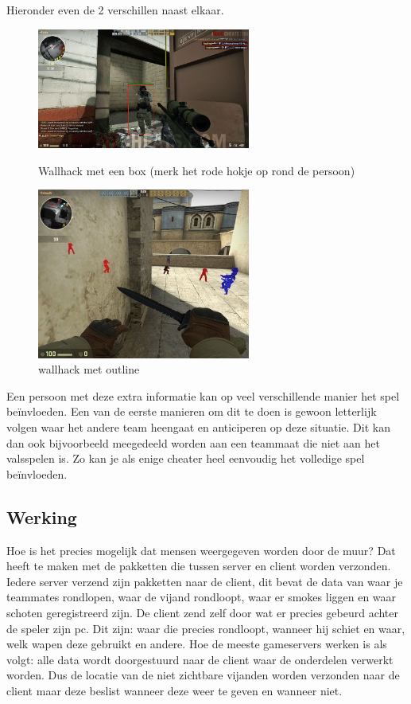 \documentclass[pdftex,a4paper,12pt,twoside]{report}
\begin{document}
Hieronder even de 2 verschillen naast elkaar.

\begin{figure}[H]
\centering
\begin{minipage}{0.48\textwidth}
\centering
\includegraphics[width=7cm]{img/wallhack-example-box}
\caption{Wallhack met een box (merk het rode hokje op rond de persoon)}
\end{minipage}\hfill
\begin{minipage}{0.48\textwidth}
\centering
\includegraphics[width=7cm]{img/wallhack-example-outline}
\caption{wallhack met outline}
\end{minipage}
\end{figure}  

Een persoon met deze extra informatie kan op veel verschillende manier het spel beïnvloeden. Een van de eerste manieren om dit te doen is gewoon letterlijk volgen waar het andere team heengaat en anticiperen op deze situatie. Dit kan dan ook bijvoorbeeld meegedeeld worden aan een teammaat die niet aan het valsspelen is. Zo kan je als enige cheater heel eenvoudig het volledige spel beïnvloeden.


\subsection{Werking}
\label{subsec:werking}
Hoe is het precies mogelijk dat mensen weergegeven worden door de muur? Dat heeft te maken met de pakketten die tussen server en client worden verzonden. Iedere server verzend zijn pakketten naar de client, dit bevat de data van waar je teammates rondlopen, waar de vijand rondloopt, waar er smokes liggen en waar schoten geregistreerd zijn. De client zend zelf door wat er precies gebeurd achter de speler zijn pc. Dit zijn: waar die precies rondloopt, wanneer hij schiet en waar, welk wapen deze gebruikt en andere. Hoe de meeste gameservers werken is als volgt: alle data wordt doorgestuurd naar de client waar de onderdelen verwerkt worden. Dus de locatie van de niet zichtbare vijanden worden verzonden naar de client maar deze beslist wanneer deze weer te geven en wanneer niet.
\\
\end{document}

